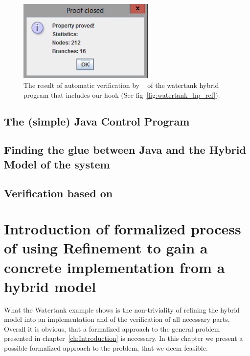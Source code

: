 \begin{figure}
	\centering
	\includegraphics[width=0.6\textwidth]{images/watertank_keym_ver}
	\caption{The result of automatic verification by \keym~ of the watertank hybrid program that includes our hook (See fig~\ref{fig:watertank_hp_ref}).}
	\label{fig:KeymaeraVerWatertank}
\end{figure}

\section{The (simple) Java Control Program}
\label{sec:Watertank:Java}

\section{Finding the glue between Java and the Hybrid Model of the system}
\label{sec:Watertank:Glue}

\section{Verification based on \keym}
\label{sec:Watertank:Verification}

\chapter{Introduction of formalized process of using Refinement to gain a concrete implementation from a hybrid model}
\label{ch:Process}

What the Watertank example shows is the non-triviality of refining the hybrid model into an implementation and of the verification of all necessary parts. Overall it is obvious, that a formalized approach to the general problem presented in chapter~\ref{ch:Introduction} is necessary. In this chapter we present a possible formalized approach to the problem, that we deem feasible.
\\

